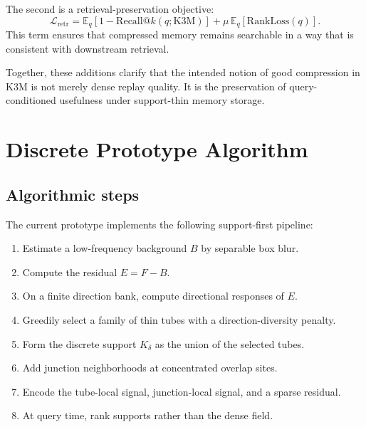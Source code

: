 \documentclass[11pt]{article}
\begin{document}
The second is a retrieval-preservation objective:
\begin{equation}
\mathcal{L}_{\mathrm{retr}}
=
\mathbb{E}_{q}\left[1-\mathrm{Recall@}k(q;\mathrm{K3M})\right]
+
\mu\, \mathbb{E}_{q}\left[\mathrm{RankLoss}(q)\right].
\end{equation}
This term ensures that compressed memory remains searchable in a way that is consistent with downstream retrieval.

Together, these additions clarify that the intended notion of good compression in K3M is not merely dense replay quality. It is the preservation of query-conditioned usefulness under support-thin memory storage.

\section{Discrete Prototype Algorithm}
\subsection{Algorithmic steps}
The current prototype implements the following support-first pipeline:
\begin{enumerate}[leftmargin=1.5em]
\item Estimate a low-frequency background $B$ by separable box blur.
\item Compute the residual $E=F-B$.
\item On a finite direction bank, compute directional responses of $E$.
\item Greedily select a family of thin tubes with a direction-diversity penalty.
\item Form the discrete support $K_\delta$ as the union of the selected tubes.
\item Add junction neighborhoods at concentrated overlap sites.
\item Encode the tube-local signal, junction-local signal, and a sparse residual.
\item At query time, rank supports rather than the dense field.
\end{enumerate}
\end{document}
